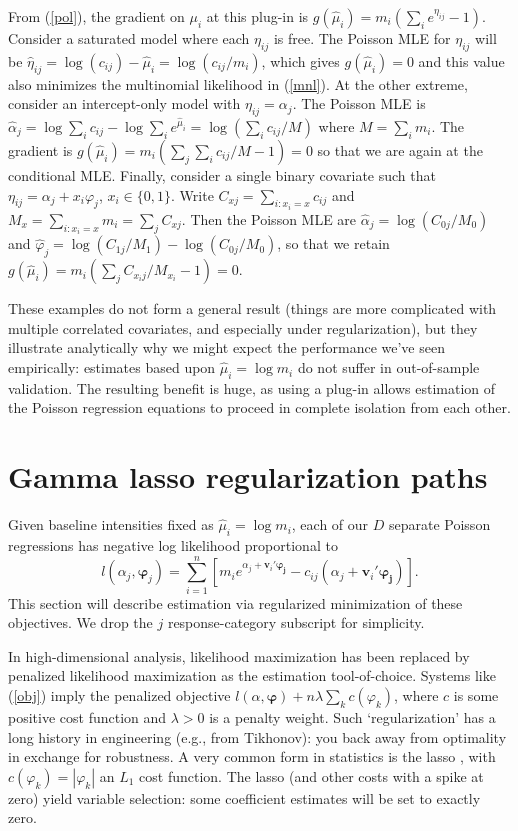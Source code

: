 \documentclass[12pt]{article}
\newcommand{\bs}[1]{\boldsymbol{#1}}
\newcommand{\bm}[1]{\mathbf{#1}}
\begin{document}
From (\ref{pol}), the gradient on $\mu_i$ at this plug-in is $g(\hat \mu_i) =
m_i \left(\sum_i e^{\eta_{ij}}-1\right)$.  Consider a saturated model where
each $\eta_{ij}$ is free.  The Poisson MLE for $\eta_{ij}$ will be $\hat
\eta_{ij} = \log(c_{ij}) - \hat \mu_i = \log(c_{ij}/m_i)$, which gives $g(\hat
\mu_i) = 0$ and this value also minimizes the multinomial likelihood in (\ref{mnl}).   At
the other extreme, consider an intercept-only model with $\eta_{ij} =
\alpha_j$.  The Poisson MLE is $\hat\alpha_j = \log \sum_i c_{ij} - \log
\sum_i e^{\hat\mu_i} = \log\left( \sum_i c_{ij}/M \right)$ where $M = \sum_i
m_i$.  The gradient is $g(\hat \mu_i) = m_i(\sum_j \sum_i c_{ij}/M -1) =
0$ so that we are again at the conditional MLE. Finally, consider a single
binary covariate such that $\eta_{ij} = \alpha_j + x_i \varphi_j$, $x_i \in
\{0,1\}$.  Write $C_{xj} = \sum_{i: x_i=x} c_{ij}$ and  $M_{x} = \sum_{i:
x_i=x} m_i = \sum_j C_{xj}$.  Then the Poisson MLE are $\hat\alpha_j =
\log(C_{0j}/M_0)$ and $\hat\varphi_j = \log(C_{1j}/M_1) - \log(C_{0j}/M_0)$,
so that we retain $g(\hat \mu_i) = m_i\left(\sum_j C_{x_ij}/M_{x_i} -1 \right)
=0$.

These examples do not form a general result (things are more complicated with multiple correlated covariates, and especially under regularization), but they illustrate analytically
why we might expect the performance we've seen empirically: estimates based upon $\hat \mu_i = \log m_i$ do not
suffer in out-of-sample validation. The resulting benefit is huge, as using a
plug-in allows estimation of the Poisson regression equations to proceed in
complete isolation from each other.

\section{Gamma lasso regularization paths}
\label{GL}

Given baseline intensities fixed as $\hat \mu_i = \log m_i$, each of our $D$ separate Poisson
regressions has negative log likelihood proportional to
\begin{equation}\label{obj}
l(\alpha_j, \bs{\varphi}_j) = \sum_{i=1}^n \left[ m_i 
e^{\alpha_j + \bm{v}_i'\bs{\varphi_j}} - c_{ij}(\alpha_j + \bm{v}_i'\bs{\varphi_j})\right].
\end{equation}
This section will describe estimation via regularized minimization of
these objectives. We drop the $j$ response-category subscript for
simplicity.

In high-dimensional analysis, likelihood maximization has been replaced by
penalized likelihood maximization as the estimation tool-of-choice.  Systems
like (\ref{obj}) imply the penalized objective $l(\alpha,\bs{\varphi}) +
n\lambda \sum_k c(\varphi_k)$, where $c$ is some positive cost function and
$\lambda >0$ is a penalty weight.  Such `regularization' has a long history in
engineering (e.g., from Tikhonov): you back away from optimality in exchange
for robustness.  A very common form in statistics is the lasso
\citep{tibshirani_regression_1996}, with $c(\varphi_k) = |\varphi_k|$ an $L_1$
cost function.  The lasso (and other costs with a spike at zero) yield
variable selection: some coefficient estimates will be set to exactly zero.
\end{document}
